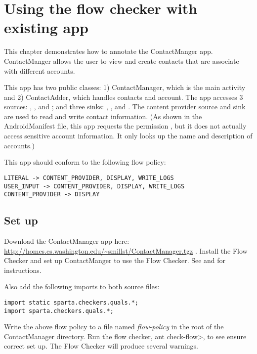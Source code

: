 \htmlhr

\chapter{Using the flow checker with existing app \label{tutorial}}

This chapter demonstrates how to annotate the ContactManger app.  ContactManger 
allows the user to view and create contacts that are associate with different accounts. 

This app has two public classes: 1) ContactManager, which is the main activity
and 2) ContactAdder, which handles contacts and account.  The app accesses
3 sources: , , and
 ; and three sinks: , 
 , and .   The content provider source and sink
 are used to read and write contact information.  (As shown in the AndroidManifest file, this app requests the permission , but it does not actually access sensitive account information.  It only looks up the name and description of accounts.) 

This app should conform to the following flow policy:
\begin{Verbatim}
LITERAL -> CONTENT_PROVIDER, DISPLAY, WRITE_LOGS
USER_INPUT -> CONTENT_PROVIDER, DISPLAY, WRITE_LOGS
CONTENT_PROVIDER -> DISPLAY
\end{Verbatim}

\section{Set up}
Download the ContactManager app here: \url{http://homes.cs.washington.edu/~smillst/ContactManager.tgz} . Install the Flow Checker and set up ContactManger to use the Flow Checker. 
See   and  for instructions.

Also add the following imports to both source files:
\begin{Verbatim} 
import static sparta.checkers.quals.*;
import sparta.checkers.quals.*;
\end{Verbatim}

Write the above flow policy to a file named \emph{flow-policy} in the root of the 
ContactManager directory.  Run the flow checker, \<ant check-flow>, to see ensure  correct
 set up.  The Flow Checker will produce several warnings.

 
\newcommand{\method}[1]{\paragraph{#1}}
\newcommand{\annomethod}[1]{\small{\texttt{#1}}\newline}

